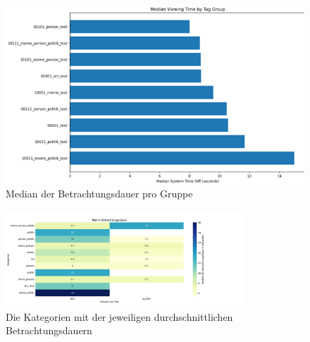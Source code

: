 \documentclass[
    language=german, %
    thesis=seminar, %
    supervisor=postdoc, %
    multiauthor=true, %
    ]{settings/csssa-thesis}
\begin{document}
\begin{figure}[htbp]
    \centering
    \includegraphics[width=\linewidth,height=0.8\textheight,keepaspectratio]{figures/Bild31.png}
    \caption{Median der Betrachtungsdauer pro Gruppe}
    \label{fig:bild27}
\end{figure}

\begin{figure}[htbp]
    \centering
    \includegraphics[width=0.8\textwidth,height=0.8\textheight,keepaspectratio]{figures/Bild2.png}
    \caption{Die Kategorien mit der jeweiligen durchschnittlichen Betrachtungsdauern}\label{fig:katDauer}
\end{figure}
\end{document}
